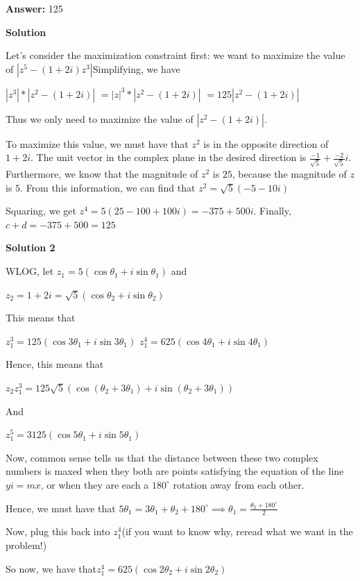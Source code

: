 \begin{enumerate}
 
 \textbf{Answer: }125



\textbf{Solution}

Let's consider the maximization constraint first: we want to maximize the value of $|z^5 - (1+2i)z^3|$Simplifying, we have

 $|z^3| * |z^2 - (1+2i)|$
$=|z|^3 * |z^2 - (1+2i)|$
$=125|z^2 - (1+2i)|$

 Thus we only need to maximize the value of $|z^2 - (1+2i)|$.

 To maximize this value, we must have that $z^2$ is in the opposite direction of $1+2i$. The unit vector in the complex plane in the desired direction is $\frac{-1}{\sqrt{5}} + \frac{-2}{\sqrt{5}} i$. Furthermore, we know that the magnitude of $z^2$ is $25$, because the magnitude of $z$ is $5$. From this information, we can find that $z^2 = \sqrt{5} (-5 - 10i)$

 Squaring, we get $z^4 = 5 (25 - 100 + 100i) = -375 + 500i$. Finally, $c+d = -375 + 500 = \boxed{125}$




\textbf{Solution 2}

WLOG, let $z_{1}=5(\cos{\theta_{1}}+i\sin{\theta_{1}})$ and

 $z_{2}=1+2i=\sqrt{5}(\cos{\theta_{2}+i\sin{\theta_{2}}})$

 This means that

 $z_{1}^3=125(\cos{3\theta_{1}}+i\sin{3\theta_{1}})$
$z_{1}^4=625(\cos{4\theta_{1}}+i\sin{4\theta_{1}})$

 Hence, this means that

 $z_{2}z_{1}^3=125\sqrt{5}(\cos({\theta_{2}+3\theta_{1}})+i\sin({\theta_{2}+3\theta_{1}}))$

 And

 $z_{1}^5=3125(\cos{5\theta_{1}}+i\sin{5\theta_{1}})$

 Now, common sense tells us that the distance between these two complex numbers is maxed when they both are points satisfying the equation of the line $yi=mx$, or when they are each a $180^{\circ}$ rotation away from each other.

 Hence, we must have that $5\theta_{1}=3\theta_{1}+\theta_{2}+180^{\circ}\implies\theta_{1}=\frac{\theta_{2}+180^{\circ}}{2}$

 Now, plug this back into $z_{1}^4$(if you want to know why, reread what we want in the problem!)

 So now, we have that$z_{1}^4=625(\cos{2\theta_{2}}+i\sin{2\theta_{2}})$


\end{enumerate}
